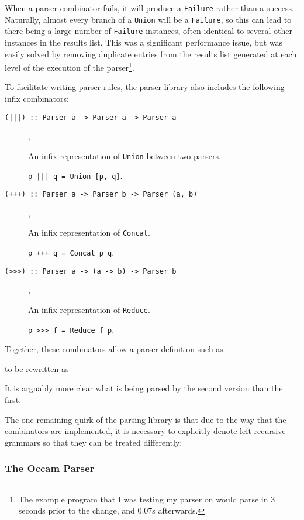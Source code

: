 When a parser combinator fails, it will produce a \texttt{Failure} rather than a
success. Naturally, almost every branch of a \texttt{Union} will be a
\texttt{Failure}, so this can lead to there being a large number of
\texttt{Failure} instances, often identical to several other instances in the
results list. This was a significant performance issue, but was easily solved by
removing duplicate entries from the results list generated at each level of the
execution of the parser\footnote{The example program that I was testing my
parser on would parse in 3 seconds prior to the change, and 0.07s afterwards.}.

To facilitate writing parser rules, the parser library also includes the
following infix combinators:
\begin{description}
  \item[\texttt{(|||) :: Parser a -> Parser a -> Parser a}],

    An infix representation of \texttt{Union} between two parsers.

    \texttt{p ||| q = Union [p, q]}.
  \item[\texttt{(+++) :: Parser a -> Parser b -> Parser (a, b)}],

    An infix representation of \texttt{Concat}.

    \texttt{p +++ q = Concat p q}.
  \item[\texttt{(>>>) :: Parser a -> (a -> b) -> Parser b}],

    An infix representation of \texttt{Reduce}.

    \texttt{p >>> f = Reduce f p}.
\end{description}

Together, these combinators allow a parser definition such as

to be rewritten as

It is arguably more clear what is being parsed by the second version than the
first.

The one remaining quirk of the parsing library is that due to the way that the
combinators are implemented, it is necessary to explicitly denote left-recursive
grammars so that they can be treated differently:


\subsubsection{The Occam Parser} \label{occam-parser-impl}


